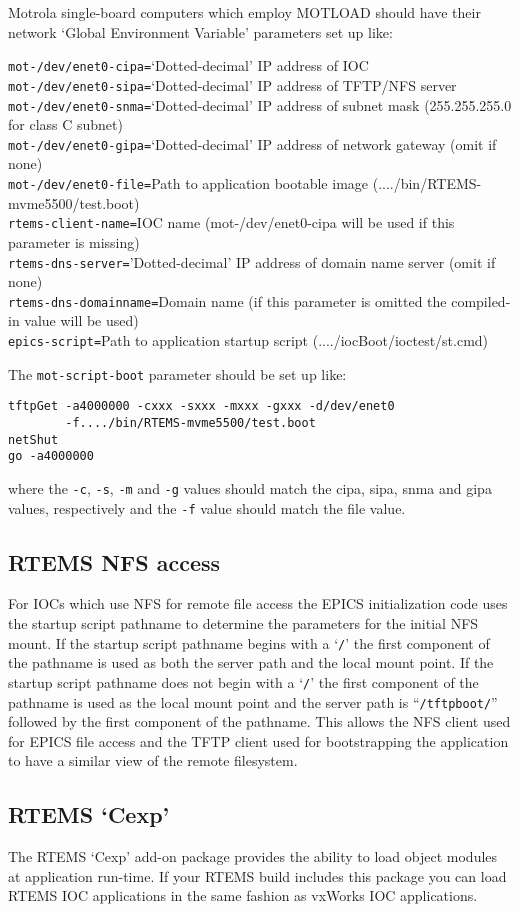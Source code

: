 Motrola single-board computers which employ MOTLOAD should have their network `Global Environment Variable' parameters set up like:

\noindent
\verb|mot-/dev/enet0-cipa=|`Dotted-decimal' IP address of IOC\\
\verb|mot-/dev/enet0-sipa=|`Dotted-decimal' IP address of TFTP/NFS server\\
\verb|mot-/dev/enet0-snma=|`Dotted-decimal' IP address of subnet mask (255.255.255.0 for class C subnet)\\
\verb|mot-/dev/enet0-gipa=|`Dotted-decimal' IP address of network gateway (omit if none)\\
\verb|mot-/dev/enet0-file=|Path to application bootable image (..../bin/RTEMS-mvme5500/test.boot)\\
\verb|rtems-client-name=|IOC name (mot-/dev/enet0-cipa will be used if this parameter is missing)\\
\verb|rtems-dns-server=|'Dotted-decimal' IP address of domain name server (omit if none)\\
\verb|rtems-dns-domainname=|Domain name (if this parameter is omitted the compiled-in value will be used)\\
\verb|epics-script=|Path to application startup script (..../iocBoot/ioctest/st.cmd)

The \verb|mot-script-boot| parameter should be set up like:

\begin{verbatim}
tftpGet -a4000000 -cxxx -sxxx -mxxx -gxxx -d/dev/enet0
        -f..../bin/RTEMS-mvme5500/test.boot
netShut
go -a4000000
\end{verbatim}

where the \verb|-c|, \verb|-s|, \verb|-m| and \verb|-g| values should match the cipa, sipa, snma and gipa values, respectively and the \verb|-f| value should match the file value.

\subsection{RTEMS NFS access}

For IOCs which use NFS for remote file access the EPICS initialization code uses the startup script pathname to determine the parameters for the initial NFS mount.
If the startup script pathname begins with a `\verb|/|' the first component of the pathname is used as both the server path and the local mount point.
If the startup script pathname does not begin with a `\verb|/|' the first component of the pathname is used as the local mount point and the server path is ``\verb|/tftpboot/|'' followed by the first component of the pathname.
This allows the NFS client used for EPICS file access and the TFTP client used for bootstrapping the application to have a similar view of the remote filesystem.

\subsection{RTEMS `Cexp'}

The RTEMS `Cexp' add-on package provides the ability to load object modules at application run-time.
If your RTEMS build includes this package you can load RTEMS IOC applications in the same fashion as vxWorks IOC applications.

